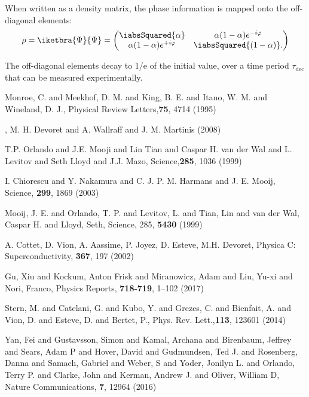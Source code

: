 \begin{thebibliography}{99}
  \noindent When  written as a  density matrix,  the phase information  is mapped
  onto the off-diagonal elements:
  \begin{equation}
    \label{eq:5}
    \rho = \iketbra{\Psi}{\Psi} = \begin{pmatrix}
      \iabsSquared{\alpha}  & \alpha(1-\alpha)e^{-i\varphi}\\
      \alpha(1-\alpha)e^{+i\varphi} & \iabsSquared{(1-\alpha)}.
    \end{pmatrix}
  \end{equation}

  \noindent The off-diagonal  elements decay to 1/e of the  initial value, over a
  time period $\tau_{\text{dec}}$ that can be measured experimentally.
    
 {Monroe, C.  and Meekhof, D. M.  and King,  B. E. and Itano,
    W.   M. and  Wineland, D.  J.}, {Physical  Review Letters},\textbf{75},  4714
  (1995)

, {M. H. Devoret and A. Wallraff and J. M. Martinis} (2008)

 {T.P. Orlando and J.E. Mooji and Lin Tian and Caspar H. van
    der Wal and L. Levitov and Seth Lloyd and J.J. Mazo}, {Science},\textbf{285},
  {1036} (1999)

  {I.  Chiorescu  and  Y.   Nakamura and  C.   J.  P.   M.
    Harmans and J. E. Mooij}, {Science}, \textbf{299}, 1869 (2003)

 {Mooij,  J. E. and Orlando,  T. P. and Levitov,  L. and Tian,
    Lin  and  van   der  Wal,  Caspar  H.  and  Lloyd,   Seth},  {Science},  285,
  \textbf{5430} (1999)
	
 A. Cottet, D. Vion, A.  Aassime, P.  Joyez, D.  Esteve, M.H.
  Devoret, Physica C: Superconductivity, \textbf{367}, 197 (2002)

 Gu,  Xiu and Kockum, Anton  Frisk and Miranowicz, Adam  and Liu,
  Yu-xi and Nori, Franco, Physics Reports, \textbf{718-719}, 1--102 (2017)

 Stern, M. and Catelani, G.   and Kubo, Y. and Grezes, C.  and
  Bienfait,   A.    and   Vion,   D.    and   Esteve,   D.   and    Bertet,   P.,
  Phys. Rev. Lett.,\textbf{113}, 123601 (2014)

  Yan,  Fei  and  Gustavsson,   Simon  and  Kamal,  Archana  and
  Birenbaum,  Jeffrey and  Sears, Adam  P and  Hover, David  and Gudmundsen,  Ted
  J. and Rosenberg, Danna and Samach, Gabriel  and Weber, S and Yoder, Jonilyn L.
  and  Orlando, Terry  P.  and  Clarke, John  and Kerman,  Andrew J.  and Oliver,
  William D, Nature Communications, \textbf{7}, 12964 (2016)


\end{thebibliography}
